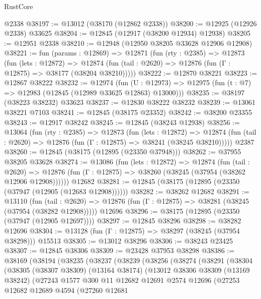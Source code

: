 \begin{lexlean}{RustCore}
\begin{coremodule}
    @2338
@38197 := @13012 (@38170 (@12862 @2338))
@38200 := @12925 (@12926 @2338) @33625
@38204 := @12845 (@12917 (@38200 @12934) @12938)
@38205 := @12951 @2338
@38210 := @12948 (@12950 @38205 @33628 @12906 @12908)
@38221 := fun (params : @12869) =>
  @12871
    (fun (rty : @2385) =>
    @12873
      (fun (lets : @12872) =>
      @12874 (fun (tail : @2620) => @12876 (fun (Γ : @12875) => @38177 (@38204 @38210)))))
@38222 := @12870 @38221
@38223 := @12867 @38222
@38232 := @12974
    (fun (U : @12973) => @12975 (fun (t : @7) => @12983 (@12845 (@12989 @33625 @12863) @13000)))
@38235 := @38197 (@38223 @38232) @33623
@38237 := @12830 @38222 @38232
@38239 := @13061 @38221 @7103
@38241 := @12845 (@38175 @23352)
@38242 := @38200 @23355
@38243 := @12917 @38242
@38245 := @12845 (@38243 @12938)
@38256 := @13064
    (fun (rty : @2385) =>
    @12873
      (fun (lets : @12872) =>
      @12874 (fun (tail : @2620) => @12876 (fun (Γ : @12875) => @38241 (@38245 @38210)))))
    @2387
@38260 := @12845 (@38175 (@12895 (@23350 @37948)))
@38262 := @37955 @38205 @33628
@38274 := @13086
    (fun (lets : @12872) =>
    @12874
      (fun (tail : @2620) =>
      @12876 (fun (Γ : @12875) => @38260 (@38245 (@37954 (@38262 @12906 @12908))))))
    @12682
@38281 := @12845 (@38175 (@12895 (@23350 (@37947 (@12905 (@12683 @12908))))))
@38282 := @38262 @12682
@38291 := @13110
    (fun (tail : @2620) => @12876 (fun (Γ : @12875) => @38281 (@38245 (@37954 (@38282 @12908)))))
    @12696
@38296 := @38175 (@12895 (@23350 (@37947 (@12905 @12697))))
@38297 := @12845 @38296
@38298 := @38282 @12696
@38304 := @13128 (fun (Γ : @12875) => @38297 (@38245 (@37954 @38298))) @15513
@38305 := @13012 @38296
@38306 := @38243 @23425
@38307 := @12845 @38306
@38309 := @23428 @37953 @38298
@38386 := @38169
    (@38194
      (@38235
        (@38237
          (@38239
            (@38256
              (@38274
                (@38291
                  (@38304
                    (@38305
                      (@38307 @38309)
                      (@13164 @38174)
                      (@13012
                        @38306
                        @38309
                        (@13169 @38242)
                        (@27243
                          @1577
                          @300
                          @11
                          @12682
                          @12691
                          @2574
                          @12696
                          (@27253
                            @12682
                            @12689
                            @4594
                            (@27260
                              @12681

\end{coremodule}
\end{lexlean}
